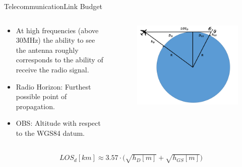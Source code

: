 \begin{frame}{Telecommunication}{Link Budget}
  \begin{columns}[T]
    \begin{column}{.5\textwidth}
      \begin{block}{}
        \begin{itemize}
          \item {At high frequencies (above 30MHz) the ability to see the antenna roughly corresponds to the ability of receive the radio signal.}
          \item {Radio Horizon: Furthest possible point of propagation.}
          \item {OBS: Altitude with respect to the WGS84 datum.}
        \end{itemize}
      \end{block}
    \end{column}
    \begin{column}{.5\textwidth}
      \begin{figure}
        \includegraphics[scale=0.25]{figures/LOS.png}
      \end{figure}
    \end{column}
  \end{columns}

    \begin{align*}      
        LOS_d[km]  \approx {3.57\cdot (\sqrt{h_D[m]} + \sqrt{h_{GS}[m]}} )
    \end{align*}

\end{frame}

